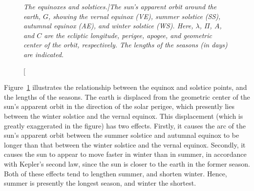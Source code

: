 \begin{figure}
\epsfysize=3.5in
\centerline{}
\caption[\em The equinoxes and solstices.]{\em The sun's apparent orbit around the earth, $G$, showing the vernal equinox (VE), summer
solstice (SS), autumnal equinox (AE), and winter solstice (WS). Here, $\lambda$, $\Pi$, $A$, and $C$
are the ecliptic longitude, perigee, apogee, and geometric center of the orbit, respectively. The lengths
of the seasons (in days) are  indicated. }\label{lf6a}   
\end{figure}


Figure~\ref{lf6a} illustrates the relationship between the equinox and solstice points, and the
lengths of the seasons. The earth is displaced from the geometric center of the sun's apparent orbit in the direction of
the solar perigee, which presently lies between the winter solstice and the vernal equinox. This displacement (which is
greatly exaggerated in the figure) has
two effects. Firstly, it causes the arc of the sun's apparent orbit between the summer solstice and autumnal equinox
to be longer than that between the winter solstice and the vernal equinox. Secondly, it causes the
sun to appear to move faster in winter than in summer, in accordance with Kepler's second law, since the sun is closer to the earth in the
former season. Both of these effects tend to lengthen summer, and
shorten winter. Hence, summer is presently the longest season, and winter the shortest.

